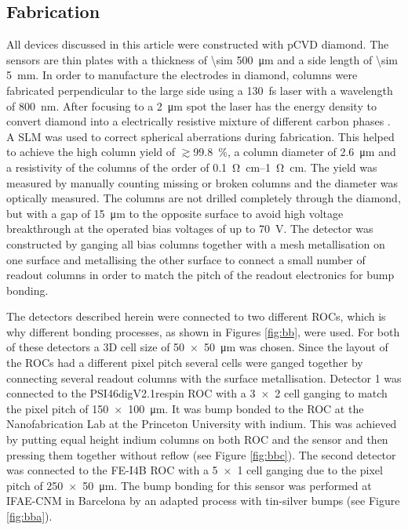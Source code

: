\subsection{Fabrication}
All devices discussed in this article were constructed with \ac{pCVD} diamond. The sensors are thin plates with a thickness of \SI{\sim 500}{\um} and a side length of \SI{\sim 5}{\mm}. In order to manufacture the electrodes in diamond, columns were fabricated perpendicular to the large side using a \SI{130}{\femto\second} laser with a wavelength of \SI{800}{\nano\meter}. After focusing to a \SI{2}{\um} spot the laser has the energy density to convert diamond into a electrically resistive mixture of different carbon phases \cite{3dfab}. A \ac{SLM} \cite{slm} was used to correct spherical aberrations during fabrication. This helped to achieve the high column yield of $\gtrsim$\SI{ 99.8}{\%}, a column diameter of \SI{2.6}{\micro\meter} and a resistivity of the columns of the order of \SIrange{.1}{1}{\ohm\cm}. The yield was measured by manually counting missing or broken columns and the diameter was optically measured. The columns are not drilled completely through the diamond, but with a gap of \SI{15}{\micro\meter} to the opposite surface to avoid high voltage breakthrough at the operated bias voltages of up to \SI{70}{\volt}. The detector was constructed by ganging all bias columns together with a mesh metallisation on one surface and metallising the other surface to connect a small number of readout columns in order to match the pitch of the readout electronics for bump bonding.\par
The detectors described herein were connected to two different \acp{ROC}, which is why different bonding processes, as shown in Figures \ref{fig:bb}, were used. For both of these detectors a 3D cell size of \SI{50x50}{\micro\meter} was chosen. Since the layout of the \acp{ROC} had a different pixel pitch several cells were ganged together by connecting several readout columns with the surface metallisation. Detector 1 was connected to the PSI46digV2.1respin \ac{ROC} \cite{kornmayer} with a \SI{3x2}{} cell ganging to match the pixel pitch of \SI{150x100}{\micro\meter}. It was bump bonded to the \ac{ROC} at the Nanofabrication Lab at the Princeton University with indium. This was achieved by putting equal height indium columns on both \ac{ROC} and the sensor and then pressing them together without reflow (see Figure \ref{fig:bbc}). The second detector was connected to the FE-I4B \ac{ROC} \cite{fei4} with a \SI{5x1}{} cell ganging due to the pixel pitch of \SI{250x50}{\micro\meter}. The bump bonding for this sensor was performed at IFAE-CNM in Barcelona by an adapted process with tin-silver bumps (see Figure \ref{fig:bba}).\par
